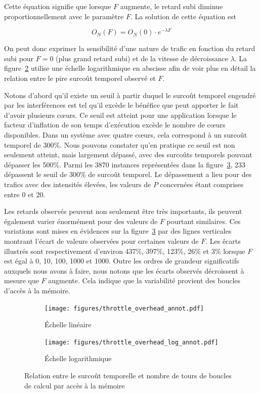 Cette équation signifie que lorsque $F$ augmente, le retard subi diminue proportionnellement avec le paramètre $F$.
La solution de cette équation est

\begin{equation}
	O_N(F) = O_N(0) \cdot e^{-\lambda F}
	\label{eq:throttle-exponential-decrease}
\end{equation}

On peut donc exprimer la sensibilité d'une nature de trafic en fonction du retard subi pour $F=0$ (plus grand retard subi) et de la vitesse de décroissance $\lambda$.
La figure~\ref{fig:throttle_overhead_all_log} utilise une échelle logarithmique en abscisse afin de voir plus en détail la relation entre le pire surcoût temporel observé et $F$.

Notons d'abord qu'il existe un seuil à partir duquel le surcoût temporel engendré par les interférences est tel qu'il excède le bénéfice que peut apporter le fait d'avoir plusieurs cœurs.
Ce seuil est atteint pour une application lorsque le facteur d'inflation de son temps d'exécution excède le nombre de cœurs disponibles.
Dans un système avec quatre cœurs, cela correspond à un surcoût temporel de 300\%.
Nous pouvons constater qu'en pratique ce seuil est non seulement atteint, mais largement dépassé, avec des surcoûts temporels pouvant dépasser les 500\%.
Parmi les 3870 instances représentées dans la figure~\ref{fig:throttle_overhead}, 233 dépassent le seuil de 300\% de surcoût temporel.
Le dépassement a lieu pour des trafics avec des intensités élevées, les valeurs de $P$ concernées étant comprises entre 0 et 20.

Les retards observés peuvent non seulement être très importants, ils peuvent également varier énormément pour des valeurs de $F$ pourtant similaires.
Ces variations sont mises en évidences sur la figure~\ref{fig:throttle_overhead} par des lignes verticales montrant l'écart de valeurs observées pour certaines valeurs de $F$.
Les écarts illustrés sont respectivement d'environ 437\%, 397\%, 123\%, 26\% et 3\% lorsque $F$ est égal à 0, 10, 100, 1000 et 1000.
Outre les ordres de grandeur significatifs auxquels nous avons à faire, nous notons que les écarts observés décroissent à mesure que $F$ augmente.
Cela indique que la variabilité provient des boucles d'accès à la mémoire. 

\begin{figure}[!h]
\centering
\begin{subfigure}[t]{0.49\linewidth}
	\texttt{[image: figures/throttle\_overhead\_annot.pdf]}
	\caption{\label{fig:throttle_overhead_all_lin}Échelle linéaire}
\end{subfigure}
\begin{subfigure}[t]{0.49\linewidth}
	\texttt{[image: figures/throttle\_overhead\_log\_annot.pdf]}
	\caption{\label{fig:throttle_overhead_all_log}Échelle logarithmique}
\end{subfigure}
\caption{\label{fig:throttle_overhead}Relation entre le surcoût temporelle et nombre de tours de boucles de calcul par accès à la mémoire}
\end{figure}

